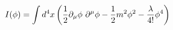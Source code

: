 \begin{equation}
\label{sei}
I(\phi)=\int d^4 x \left (  {1 \over 2} 
\partial_{\mu} \phi ~ \partial^{\mu} \phi
 - {1 \over 2} m^2 \phi ^2 - { \lambda 
\over 4!} \phi ^4\right )
\end{equation}

